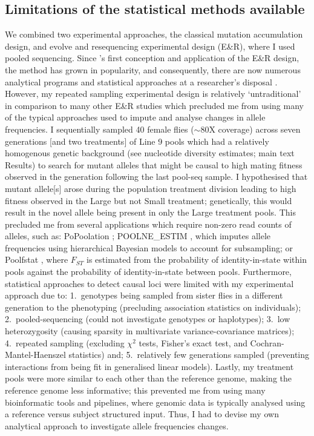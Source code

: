 \subsection{Limitations of the statistical methods available}

We combined two experimental approaches, the classical mutation accumulation design, and evolve and resequencing experimental design (E\&R), where I used pooled sequencing. Since \citet{Turn11}'s first conception and application of the E\&R design, the method has grown in popularity, and consequently, there are now numerous analytical programs and statistical approaches at a researcher’s disposal \citep{Schl14, Schl15, Vlac19}. However, my repeated sampling experimental design is relatively ‘untraditional’ in comparison to many other E\&R studies which precluded me from using many of the typical approaches used to impute and analyse changes in allele frequencies. I sequentially sampled 40 female flies ($\sim80$X coverage) across seven generations [and two treatments] of Line 9 pools which had a relatively homogenous genetic background (see nucleotide diversity estimates; main text Results) to search for mutant alleles that might be causal to high mating fitness observed in the generation following the last pool-seq sample. I hypothesised that mutant allele[s] arose during the population treatment division leading to high fitness observed in the Large but not Small treatment; genetically, this would result in the novel allele being present in only the Large treatment pools. This precluded me from several applications which require non-zero read counts of alleles, such as: PoPoolation \citep{Kofl11}; POOLNE\_ESTIM \citep{Gaut13}, which imputes allele frequencies using hierarchical Bayesian models to account for subsampling; or Poolfstat \citep{Hive18}, where $F_{ST}$ is estimated from the probability of identity-in-state within pools against the probability of identity-in-state between pools. Furthermore, statistical approaches to detect causal loci were limited with my experimental approach due to: 1.~genotypes being sampled from sister flies in a different generation to the phenotyping (precluding association statistics on individuals); 2.~pooled-sequencing (could not investigate genotypes or haplotypes); 3.~low heterozygosity (causing sparsity in multivariate variance-covariance matrices); 4.~repeated sampling (excluding $\chi^2$ tests, Fisher’s exact test, and Cochran-Mantel-Haenszel statistics) and; 5.~relatively few generations sampled (preventing interactions from being fit in generalised linear models). Lastly, my treatment pools were more similar to each other than the reference genome, making the reference genome less informative; this prevented me from using many bioinformatic tools and pipelines, where genomic data is typically analysed using a reference versus subject structured input. Thus, I had to devise my own analytical approach to investigate allele frequencies changes. \par

